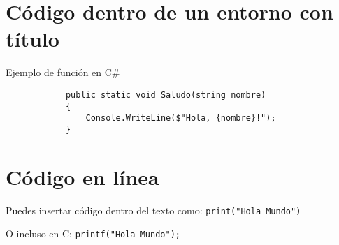 \documentclass[12pt,a4paper]{article}
\begin{document}
	\section{Código dentro de un entorno con título}
	
	\begin{listing}[H]
		\caption{Ejemplo de función en C#}
		\begin{verbatim}
			public static void Saludo(string nombre)
			{
				Console.WriteLine($"Hola, {nombre}!");
			}
		\end{verbatim}
	\end{listing}
	
	\section{Código en línea}
	
	Puedes insertar código dentro del texto como:
	\texttt{print("Hola Mundo")}
	
	O incluso en C: \texttt{printf("Hola Mundo");}
	
\end{document}
